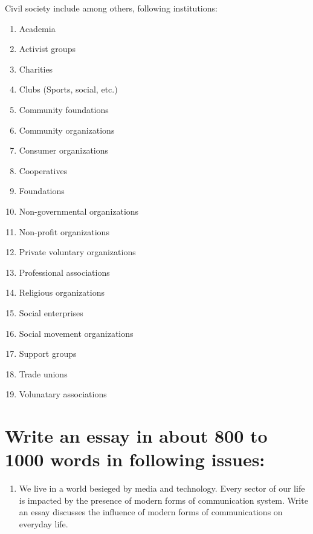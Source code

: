\documentclass[
  openany]{book}
\providecommand{\tightlist}{%
  \setlength{\itemsep}{0pt}\setlength{\parskip}{0pt}}
\begin{document}
Civil society include among others, following institutions:

\begin{enumerate}
\def\labelenumi{\arabic{enumi}.}
\tightlist
\item
  Academia
\item
  Activist groups
\item
  Charities
\item
  Clubs (Sports, social, etc.)
\item
  Community foundations
\item
  Community organizations
\item
  Consumer organizations
\item
  Cooperatives
\item
  Foundations
\item
  Non-governmental organizations
\item
  Non-profit organizations
\item
  Private voluntary organizations
\item
  Professional associations
\item
  Religious organizations
\item
  Social enterprises
\item
  Social movement organizations
\item
  Support groups
\item
  Trade unions
\item
  Volunatary associations
\end{enumerate}

\hypertarget{write-an-essay-in-about-800-to-1000-words-in-following-issues}{%
\section{Write an essay in about 800 to 1000 words in following issues:}\label{write-an-essay-in-about-800-to-1000-words-in-following-issues}}

\begin{enumerate}
\def\labelenumi{\arabic{enumi}.}
\tightlist
\item
  We live in a world besieged by media and technology. Every sector of our life is impacted by the presence of modern forms of communication system. Write an essay discusses the influence of modern forms of communications on everyday life.
\end{enumerate}
\end{document}
